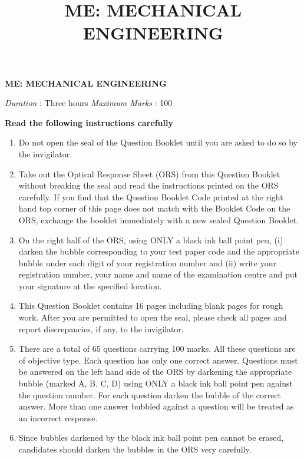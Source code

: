 \documentclass[journal,12pt,onecolumn]{IEEEtran}
\title{ME: MECHANICAL ENGINEERING}
\begin{document}
\begin{center}
    \Large
    \textbf{ME: MECHANICAL ENGINEERING}
\end{center}

\textit{Duration} : Three hours
\hfill
\textit{Maximum Marks} : 100


\textbf{Read the following instructions carefully}

\begin{enumerate}
    \item Do not open the seal of the Question Booklet until you are asked to do so by the invigilator.

    \item Take out the Optical Response Sheet (ORS) from this Question Booklet without breaking the seal and read the instructions printed on the ORS carefully. If you find that the Question Booklet Code printed at the right hand top corner of this page does not match with the Booklet Code on the ORS, exchange the booklet immediately with a new sealed Question Booklet.

    \item On the right half of the ORS, using ONLY a black ink ball point pen, (i) darken the bubble corresponding to your test paper code and the appropriate bubble under each digit of your registration number and (ii) write your registration number, your name and name of the examination centre and put your signature at the specified location.

    \item This Question Booklet contains 16 pages including blank pages for rough work. After you are permitted to open the seal, please check all pages and report discrepancies, if any, to the invigilator.

    \item There are a total of 65 questions carrying 100 marks. All these questions are of objective type. Each question has only one correct answer. Questions must be answered on the left hand side of the ORS by darkening the appropriate bubble (marked A, B, C, D) using ONLY a black ink ball point pen against the question number. For each question darken the bubble of the correct answer. More than one answer bubbled against a question will be treated as an incorrect response.

    \item Since bubbles darkened by the black ink ball point pen cannot be erased, candidates should darken the bubbles in the ORS very carefully.


\end{enumerate}
\end{document}
